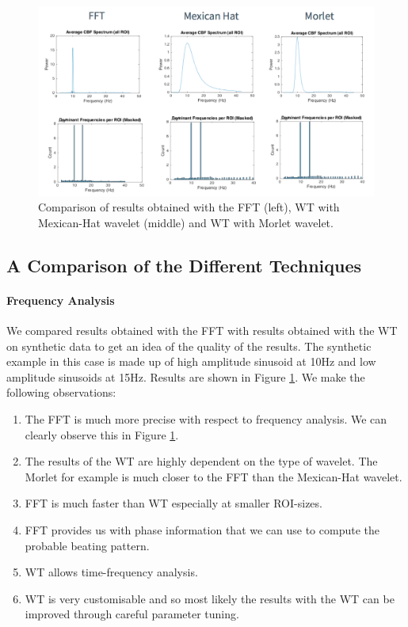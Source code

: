 \documentclass[11pt]{scrartcl}
\begin{document}
\begin{figure}[h]
  \centering
  \includegraphics[width=\linewidth]{compare}
  \caption{Comparison of results obtained with the FFT (left), WT with Mexican-Hat wavelet (middle) and WT with Morlet wavelet. }
  \label{fig:compare}
\end{figure}


\subsection{A Comparison of the Different Techniques}
\label{sec:comp-techn-used}

\paragraph{Frequency Analysis}

We compared results obtained with the FFT with results obtained with the WT on synthetic data to get an idea of the quality of the results. The synthetic example in this case is made up of high amplitude sinusoid at 10Hz and low amplitude sinusoids at 15Hz. Results are shown in Figure \ref{fig:compare}. We make the following observations:

\begin{enumerate}
\item The FFT is much more precise with respect to frequency analysis. We can clearly observe this in Figure \ref{fig:compare}. 
\item The results of the WT are highly dependent on the type of wavelet. The Morlet for example is much closer to the FFT than the Mexican-Hat wavelet.
\item FFT is much faster than WT especially at smaller ROI-sizes.
\item FFT provides us with phase information that we can use to compute the probable beating pattern.
\item WT allows time-frequency analysis.
\item WT is very customisable and so most likely the results with the WT can be improved through careful parameter tuning.
\end{enumerate}
\end{document}
